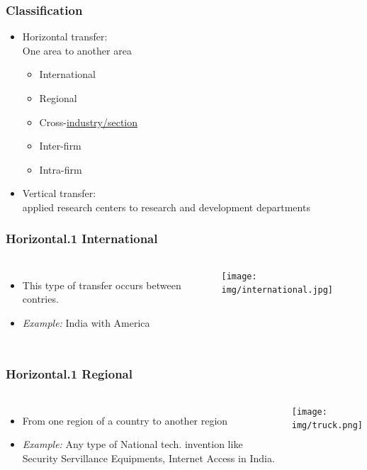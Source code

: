 \begin{frame}
\frametitle{Classification}
\begin{itemize}
	\item Horizontal transfer:
	\\One area to another area
	\begin{itemize}
		\item International
		\item Regional
		\item Cross-\underline{industry/section}
		\item Inter-firm
		\item Intra-firm
	\end{itemize}
	\item Vertical transfer:
	\\applied research centers to research and development departments
\end{itemize}
\end{frame}

\begin{frame}
\frametitle{Horizontal.1 International}
\begin{columns}
\begin{itemize}
	\item This type of transfer occurs between contries.
	\item \textit{Example:} India with America
\end{itemize}
\texttt{[image: img/international.jpg]}
\end{columns}
\end{frame}

\begin{frame}
\frametitle{Horizontal.1 Regional}
\begin{columns}
\begin{itemize}
	\item From one region of a country to another region
	\item \textit{Example:} Any type of National tech. invention like Security Servillance Equipments, Internet Access in India.
\end{itemize}
\texttt{[image: img/truck.png]}
\end{columns}
\end{frame}

